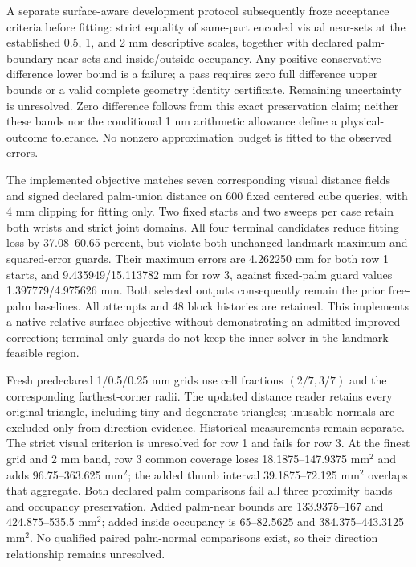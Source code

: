 \documentclass[10pt,letterpaper]{article}
\begin{document}
A separate surface-aware development protocol subsequently froze acceptance
criteria before fitting: strict equality of same-part encoded visual near-sets
at the established 0.5, 1, and 2 mm descriptive scales, together with declared
palm-boundary near-sets and inside/outside occupancy. Any positive conservative
difference lower bound is a failure; a pass requires zero full difference upper
bounds or a valid complete geometry identity certificate. Remaining uncertainty
is unresolved. Zero difference follows from this exact preservation claim;
neither these bands nor the conditional 1 nm arithmetic allowance define a
physical-outcome tolerance. No nonzero approximation budget is fitted to the
observed errors.

The implemented objective matches seven corresponding visual distance fields
and signed declared palm-union distance on 600 fixed centered cube queries,
with 4 mm clipping for fitting only. Two fixed starts and two sweeps per case
retain both wrists and strict joint domains. All four terminal candidates
reduce fitting loss by 37.08--60.65 percent, but violate both unchanged landmark
maximum and squared-error guards. Their maximum errors are 4.262250 mm for both
row 1 starts, and 9.435949/15.113782 mm for row 3, against fixed-palm guard
values 1.397779/4.975626 mm. Both selected outputs consequently remain the prior
free-palm baselines. All attempts and 48 block histories are retained. This
implements a native-relative surface objective without demonstrating an admitted
improved correction; terminal-only guards do not keep the inner solver in the
landmark-feasible region.

Fresh predeclared 1/0.5/0.25 mm grids use cell fractions $(2/7,3/7)$ and the
corresponding farthest-corner radii. The updated distance reader retains every
original triangle, including tiny and degenerate triangles; unusable normals
are excluded only from direction evidence. Historical measurements remain
separate. The strict visual criterion is unresolved for row 1 and fails for
row 3. At the finest grid and 2 mm band, row 3 common coverage loses
18.1875--147.9375 mm$^2$ and adds 96.75--363.625 mm$^2$; the added thumb interval
39.1875--72.125 mm$^2$ overlaps that aggregate. Both declared palm comparisons
fail all three proximity bands and occupancy preservation. Added palm-near
bounds are 133.9375--167 and 424.875--535.5 mm$^2$; added inside occupancy is
65--82.5625 and 384.375--443.3125 mm$^2$. No qualified paired palm-normal
comparisons exist, so their direction relationship remains unresolved.
\end{document}
